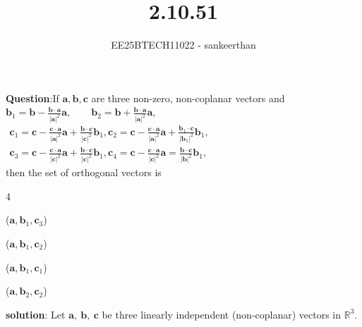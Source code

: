 \documentclass[journal]{IEEEtran}
\theoremstyle{remark}
\begin{document}
\title{2.10.51}
\author{EE25BTECH11022 - sankeerthan}
{\let\newpage\relax\maketitle}

\renewcommand{\thefigure}{\theenumi}
\renewcommand{\thetable}{\theenumi}
\setlength{\intextsep}{10pt} %



\textbf{Question}:If $\mathbf{a}, \mathbf{b}, \mathbf{c}$ are three non-zero, non-coplanar vectors and \\

$\mathbf{b}_1 = \mathbf{b} - \frac{\mathbf{b} \cdot \mathbf{a}}{|\mathbf{a}|^2} \mathbf{a}, \qquad \mathbf{b}_2 = \mathbf{b} + \frac{\mathbf{b} \cdot \mathbf{a}}{|\mathbf{a}|^2} \mathbf{a}$, \\
$\begin{aligned}
\mathbf{c}_1 = \mathbf{c} - \frac{\mathbf{c} \cdot \mathbf{a}}{|\mathbf{a}|^2} \mathbf{a} + \frac{\mathbf{b} \cdot \mathbf{c}}{|\mathbf{c}|^2} \mathbf{b}_1, 
\mathbf{c}_2 = \mathbf{c} - \frac{\mathbf{c} \cdot \mathbf{a}}{|\mathbf{a}|^2} \mathbf{a} + \frac{\mathbf{b}_1 \cdot \mathbf{c}}{|\mathbf{b}_1|^2} \mathbf{b}_1, \\
\mathbf{c}_3 = \mathbf{c} - \frac{\mathbf{c} \cdot \mathbf{a}}{|\mathbf{c}|^2} \mathbf{a} + \frac{\mathbf{b} \cdot \mathbf{c}}{|\mathbf{c}|^2} \mathbf{b}_1,
\mathbf{c}_4 = \mathbf{c} - \frac{\mathbf{c} \cdot \mathbf{a}}{|\mathbf{c}|^2} \mathbf{a} = \frac{\mathbf{b} \cdot \mathbf{c}}{|\mathbf{b}|^2} \mathbf{b}_1,
\end{aligned}$ \\

then the set of orthogonal vectors is
\begin{enumerate} 
\begin{multicols}{4}
\item($\mathbf{a}, \mathbf{b}_1, \mathbf{c}_3$) 
\item($\mathbf{a}, \mathbf{b}_1, \mathbf{c}_2$)
\item($\mathbf{a}, \mathbf{b}_1, \mathbf{c}_1$)
\item($\mathbf{a}, \mathbf{b}_2, \mathbf{c}_2$) 
\end{multicols}
\end{enumerate}
\textbf{solution}:
Let $\mathbf{a},\ \mathbf{b},\ \mathbf{c}$ be three linearly independent (non-coplanar) vectors in $\mathbb{R}^3$. 
\end{document}
